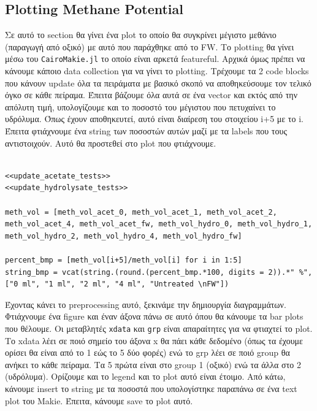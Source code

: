 \documentclass[11pt]{article}
\begin{document}
\subsection{Plotting Methane Potential}
\label{sec:orgc37a0e0}
Σε αυτό το section θα γίνει ένα plot το οποίο θα συγκρίνει μέγιστο μεθάνιο (παραγωγή από οξικό) με αυτό που παράχθηκε από το FW. Το plotting θα γίνει μέσω του \texttt{CairoMakie.jl} το οποίο είναι αρκετά featureful. Αρχικά όμως πρέπει να κάνουμε κάποιο data collection για να γίνει το plotting. Τρέχουμε τα 2 code blocks που κάνουν update όλα τα πειράματα με βασικό σκοπό να αποθηκεύσουμε τον τελικό όγκο σε κάθε πείραμα. Έπειτα βάζουμε όλα αυτά σε ένα vector και εκτός από την απόλυτη τιμή, υπολογίζουμε και το ποσοστό του μέγιστου που πετυχαίνει το υδρόλυμα. Όπως έχουν αποθηκευτεί, αυτό είναι διαίρεση του στοιχείου i+5 με το i. Έπειτα φτιάχνουμε ένα string των ποσοστών αυτών μαζί με τα labels που τους αντιστοιχούν. Αυτό θα προστεθεί στο plot που φτιάχνουμε.

\begin{verbatim}

<<update_acetate_tests>>
<<update_hydrolysate_tests>>

meth_vol = [meth_vol_acet_0, meth_vol_acet_1, meth_vol_acet_2, meth_vol_acet_4, meth_vol_acet_fw, meth_vol_hydro_0, meth_vol_hydro_1, meth_vol_hydro_2, meth_vol_hydro_4, meth_vol_hydro_fw]

percent_bmp = [meth_vol[i+5]/meth_vol[i] for i in 1:5]
string_bmp = vcat(string.(round.(percent_bmp.*100, digits = 2)).*" %", ["0 ml", "1 ml", "2 ml", "4 ml", "Untreated \nFW"])

\end{verbatim}

Έχοντας κάνει το preprocessing αυτό, ξεκινάμε την δημιουργία διαγραμμάτων. Φτιάχνουμε ένα figure και έναν άξονα πάνω σε αυτό όπου θα κάνουμε τα bar plots που θέλουμε. Οι μεταβλητές \texttt{xdata} και \texttt{grp} είναι απαραίτητες για να φτιαχτεί το plot. Το xdata λέει σε ποιό σημείο του άξονα x θα πάει κάθε δεδομένο (όπως τα έχουμε ορίσει θα είναι από το 1 εώς το 5 δύο φορές) ενώ το grp λέει σε ποιό group θα ανήκει το κάθε πείραμα. Τα 5 πρώτα είναι στο group 1 (οξικό) ενώ τα άλλα στο 2 (υδρόλυμα). Ορίζουμε και το legend και το plot αυτό είναι έτοιμο. Από κάτω, κάνουμε insert το string με τα ποσοστά που υπολογίστηκε παραπάνω σε ένα text plot του Makie. Έπειτα, κάνουμε save το plot αυτό.
\end{document}
